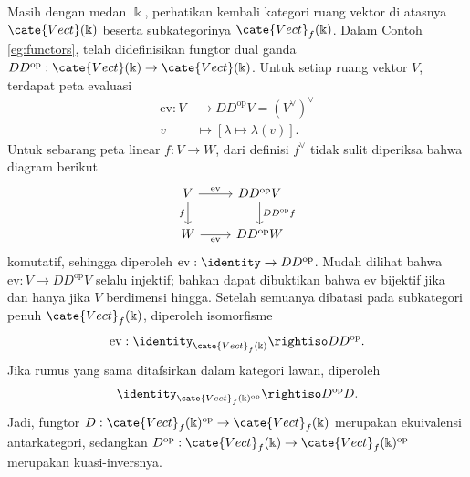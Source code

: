 \begin{example}\label{eg:vectf-duality}
	Masih dengan medan $\Bbbk$, perhatikan kembali kategori ruang vektor di atasnya $\cate{Vect}(\Bbbk)$ beserta subkategorinya $\cate{Vect}_f(\Bbbk)$. Dalam Contoh \ref{eg:functors}, telah didefinisikan fungtor dual ganda $D D^\text{op}: \cate{Vect}(\Bbbk) \to \cate{Vect}(\Bbbk)$. Untuk setiap ruang vektor $V$, terdapat peta evaluasi
	\begin{align*}
		\text{ev}: V & \longrightarrow DD^\text{op} V = (V^\vee)^\vee \\
		v & \longmapsto [\lambda \mapsto \lambda(v)].
	\end{align*}
	Untuk sebarang peta linear $f: V \to W$, dari definisi $f^\vee$ tidak sulit diperiksa bahwa diagram berikut
	\[\begin{tikzcd}
		V \arrow[r, "\text{ev}"] \ar[d, "f"'] & DD^\text{op} V \arrow[d, "{DD^\text{op} f}"] \\
		W \ar[r, "\text{ev}"'] & DD^\text{op} W
	\end{tikzcd} \]
	komutatif, sehingga diperoleh $\text{ev}: \identity \to D D^\text{op}$. Mudah dilihat bahwa $\text{ev}: V \to D D^\text{op} V$ selalu injektif; bahkan dapat dibuktikan bahwa $\text{ev}$ bijektif jika dan hanya jika $V$ berdimensi hingga. Setelah semuanya dibatasi pada subkategori penuh $\cate{Vect}_f(\Bbbk)$, diperoleh isomorfisme
	\[ \text{ev}: \identity_{\cate{Vect}_f(\Bbbk)} \rightiso D D^\text{op}. \]
	Jika rumus yang sama ditafsirkan dalam kategori lawan, diperoleh
	\[ \identity_{\cate{Vect}_f(\Bbbk)^\text{op}} \rightiso D^\text{op} D. \]
	Jadi, fungtor $D: \cate{Vect}_f(\Bbbk)^\text{op} \to \cate{Vect}_f(\Bbbk)$ merupakan ekuivalensi antarkategori, sedangkan $D^\text{op}: \cate{Vect}_f(\Bbbk) \to \cate{Vect}_f(\Bbbk)^\text{op}$ merupakan kuasi-inversnya.
\end{example}

